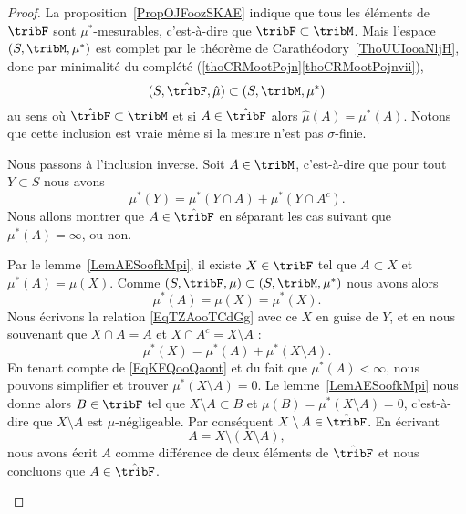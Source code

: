 \begin{proof}
	La proposition~\ref{PropOJFoozSKAE} indique que tous les éléments de \( \tribF\) sont \( \mu^*\)-mesurables, c'est-à-dire que \( \tribF\subset \tribM\). Mais l'espace \( (S,\tribM,\mu^*)\) est complet par le théorème de Carathéodory~\ref{ThoUUIooaNljH}, donc par minimalité du complété (\ref{thoCRMootPojn}\ref{thoCRMootPojnvii}),
	\begin{equation}
		(S,\hat\tribF,\hat\mu)\subset(S,\tribM,\mu^*)
	\end{equation}
	au sens où \( \hat\tribF\subset\tribM\) et si \( A\in\hat\tribF\) alors \( \hat\mu(A)=\mu^*(A)\). Notons que cette inclusion est vraie même si la mesure n'est pas \( \sigma\)-finie.

	Nous passons à l'inclusion inverse. Soit \( A\in\tribM\), c'est-à-dire que pour tout \( Y\subset S\) nous avons
	\begin{equation}    \label{EqTZAooTCdGg}
		\mu^*(Y)=\mu^*(Y\cap A)+\mu^*(Y\cap A^c).
	\end{equation}
	Nous allons montrer que \( A\in\hat\tribF\) en séparant les cas suivant que \( \mu^*(A)=\infty\), ou non.

	\begin{subproof}
		\spitem[Si \( \mu^*(A)<\infty\)]

		Par le lemme~\ref{LemAESoofkMpi}, il existe \( X\in\tribF\) tel que \( A\subset X\) et \( \mu^*(A)=\mu(X)\). Comme \( (S,\tribF,\mu)\subset (S,\tribM,\mu^*)\) nous avons alors
		\begin{equation}    \label{EqKFQooQaont}
			\mu^*(A)=\mu(X)=\mu^*(X).
		\end{equation}
		Nous écrivons la relation \eqref{EqTZAooTCdGg} avec ce \( X\) en guise de \( Y\), et en nous souvenant que \( X\cap A=A\) et \( X\cap A^c=X\setminus A\) :
		\begin{equation}
			\mu^*(X)=\mu^*(A)+\mu^*(X\setminus A).
		\end{equation}
		En tenant compte de \eqref{EqKFQooQaont} et du fait que \( \mu^*(A)<\infty\), nous pouvons simplifier et trouver \( \mu^*(X\setminus A)=0\). Le lemme~\ref{LemAESoofkMpi} nous donne alors \( B\in\tribF\) tel que \( X\setminus A\subset B\) et \( \mu(B)=\mu^*(X\setminus A)=0\), c'est-à-dire que \( X\setminus A\) est \( \mu\)-négligeable. Par conséquent \( X\setminus A\in\hat\tribF\). En écrivant
		\begin{equation}
			A=X\setminus(X\setminus A),
		\end{equation}
		nous avons écrit \( A\) comme différence de deux éléments de \( \hat\tribF\) et nous concluons que \( A\in\hat\tribF\).


\end{subproof}
\end{proof}
